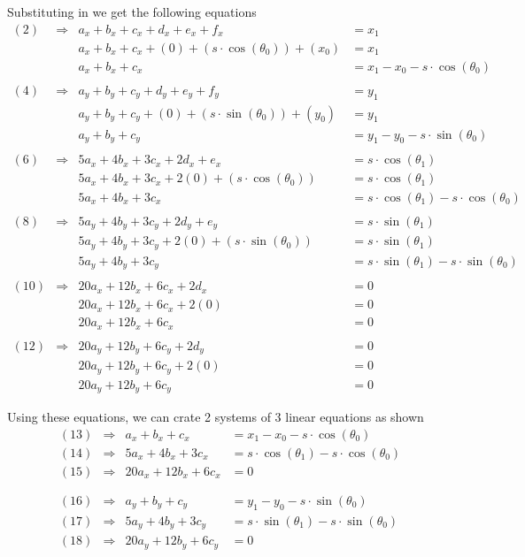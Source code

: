 \documentclass[12pt, letterpaper]{article}
\begin{document}
Substituting in we get the following equations
\begin{align}
(2) &\Rightarrow & a_x + b_x + c_x + d_x + e_x + f_x &= x_1 \nonumber \\
&& a_x + b_x + c_x + (0) + (s \cdot \cos(\theta_0)) + (x_0) &= x_1 \nonumber \\
&& a_x + b_x + c_x &= x_1 - x_0 - s \cdot \cos(\theta_0) \\
\nonumber \\
(4) &\Rightarrow & a_y + b_y + c_y + d_y + e_y + f_y &= y_1 \nonumber \\
&& a_y + b_y + c_y + (0) + (s \cdot \sin(\theta_0)) + (y_0) &= y_1 \nonumber \\
&& a_y + b_y + c_y &= y_1 - y_0 - s \cdot \sin(\theta_0) \\
\nonumber \\
(6) &\Rightarrow & 5a_x + 4b_x + 3c_x + 2d_x + e_x &= s \cdot \cos(\theta_1) \nonumber \\
&& 5a_x + 4b_x + 3c_x + 2(0) + (s \cdot \cos(\theta_0)) &= s \cdot \cos(\theta_1) \nonumber \\
&& 5a_x + 4b_x + 3c_x &= s \cdot \cos(\theta_1) - s \cdot \cos(\theta_0) \\
\nonumber \\
(8) &\Rightarrow & 5a_y + 4b_y + 3c_y + 2d_y + e_y &= s \cdot \sin(\theta_1) \nonumber \\
&& 5a_y + 4b_y + 3c_y + 2(0) + (s \cdot \sin(\theta_0)) &= s \cdot \sin(\theta_1) \nonumber \\
&& 5a_y + 4b_y + 3c_y &= s \cdot \sin(\theta_1) - s \cdot \sin(\theta_0) \\
\nonumber \\
(10) &\Rightarrow & 20a_x + 12b_x + 6c_x + 2d_x &= 0 \nonumber \\
&& 20a_x + 12b_x + 6c_x + 2(0) &= 0 \nonumber \\
&& 20a_x + 12b_x + 6c_x &= 0 \\
\nonumber \\
(12) &\Rightarrow & 20a_y + 12b_y + 6c_y + 2d_y &= 0 \nonumber \\
&& 20a_y + 12b_y + 6c_y + 2(0) &= 0 \nonumber \\
&& 20a_y + 12b_y + 6c_y &= 0 
\end{align}

Using these equations, we can crate 2 systems of 3 linear equations as shown
\begin{align*}
(13) &\Rightarrow & a_x + b_x + c_x &= x_1 - x_0 - s \cdot \cos(\theta_0) \\
(14) &\Rightarrow & 5a_x + 4b_x + 3c_x &= s \cdot \cos(\theta_1) - s \cdot \cos(\theta_0) \\
(15) &\Rightarrow & 20a_x + 12b_x + 6c_x &= 0 \\
\\ \\
(16) &\Rightarrow & a_y + b_y + c_y &= y_1 - y_0 - s \cdot \sin(\theta_0) \\
(17) &\Rightarrow & 5a_y + 4b_y + 3c_y &= s \cdot \sin(\theta_1) - s \cdot \sin(\theta_0) \\
(18) &\Rightarrow & 20a_y + 12b_y + 6c_y &= 0 
\end{align*}
\end{document}
